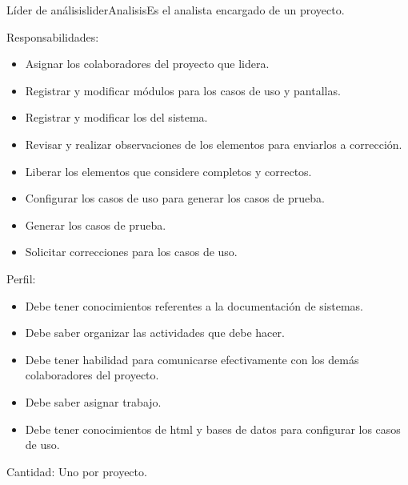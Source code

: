 \begin{actor}{Líder de análisis}{liderAnalisis}{Es el analista encargado de un proyecto.}
    \item[Responsabilidades:] \hspace{1pt}
    \begin{itemize}
	\item Asignar los colaboradores del proyecto que lidera.
	\item Registrar y modificar módulos para los casos de uso y pantallas.
	\item Registrar y modificar los  del sistema.
	\item Revisar y realizar observaciones de los elementos para enviarlos a corrección.
	\item Liberar los elementos que considere completos y correctos.
	\item Configurar los casos de uso para generar los casos de prueba.
	\item Generar los casos de prueba.
	\item Solicitar correcciones para los casos de uso.
    \end{itemize}
    \item[Perfil:] \hspace{1pt}
    \begin{itemize}
	\item Debe tener conocimientos referentes a la documentación de sistemas.
	\item Debe saber organizar las actividades que debe hacer.
	\item Debe tener habilidad para comunicarse efectivamente con los demás colaboradores del proyecto.
	\item Debe saber asignar trabajo.
	\item Debe tener conocimientos de html y bases de datos para configurar los casos de uso.
    \end{itemize}
    \item[Cantidad:] Uno por proyecto.
\end{actor}

